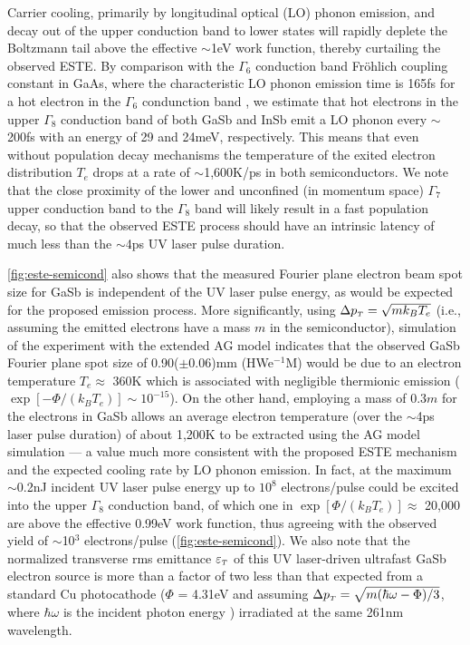 Carrier cooling, primarily by longitudinal optical (LO) phonon emission, and decay out of the upper conduction band to lower states will rapidly deplete the Boltzmann tail above the effective $\sim$1eV work function, thereby curtailing the observed ESTE.
By comparison with the $\Gamma_6$ conduction band Fr\"ohlich coupling constant in GaAs, where the characteristic LO phonon emission time is 165fs for a hot electron in the $\Gamma_6$ condunction band \cite{kash_subpicosecond_1985}, we estimate that hot electrons in the upper $\Gamma_8$ conduction band of both GaSb and InSb emit a LO phonon every $\sim$200fs with an energy of 29 and 24meV, respectively.
This means that even without population decay mechanisms the temperature of the exited electron distribution $T_e$ drops at a rate of $\sim$1,600K/ps in both semiconductors.
We note that the close proximity of the lower and unconfined (in momentum space) $\Gamma_7$ upper conduction band to the $\Gamma_8$ band will likely result in a fast population decay, so that the observed ESTE process should have an intrinsic latency of much less than the $\sim$4ps UV laser pulse duration.

\ref{fig:este-semicond} also shows that the measured Fourier plane electron beam spot size for GaSb is independent of the UV laser pulse energy, as would be expected for the proposed emission process.
More significantly, using $\Delta p_{{\scriptscriptstyle T}} = \sqrt{m k_B T_e}$ (i.e., assuming the emitted electrons have a mass $m$ in the semiconductor), simulation of the experiment with the extended AG model \cite{berger_semi-analytic_2010} indicates that the observed GaSb Fourier plane spot size of 0.90($\pm$0.06)mm (HWe$^{-1}$M) would be due to an electron temperature $T_e \approx$ 360K which is associated with negligible thermionic emission ($\exp[-\Phi/(k_B T_e)] \sim 10^{-15}$).
On the other hand, employing a mass of 0.3$m$ for the electrons in GaSb allows an average electron temperature (over the $\sim$4ps laser pulse duration) of about 1,200K to be extracted using the AG model simulation --- a value much more consistent with the proposed ESTE mechanism and the expected cooling rate by LO phonon emission.
In fact, at the maximum $\sim$0.2nJ incident UV laser pulse energy up to $10^8$ electrons/pulse could be excited into the upper $\Gamma_8$ conduction band, of which one in $\exp[\Phi/(k_B T_e)] \approx$ 20,000 are above the effective 0.99eV work function, thus agreeing with the observed yield of $\sim$10$^3$ electrons/pulse (\ref{fig:este-semicond}).
We also note that the normalized transverse rms emittance $\varepsilon_{{\scriptscriptstyle T}}$ of this UV laser-driven ultrafast GaSb electron source is more than a factor of two less than that expected from a standard Cu photocathode ($\Phi$ = 4.31eV and assuming $\Delta p_{{\scriptscriptstyle T}} = \sqrt{m ( \hbar \omega - \Phi ) / 3 }$, where $\hbar \omega$ is the incident photon energy \cite{dowell_quantum_2009,jensen_emittance_2010}) irradiated at the same 261nm wavelength.

